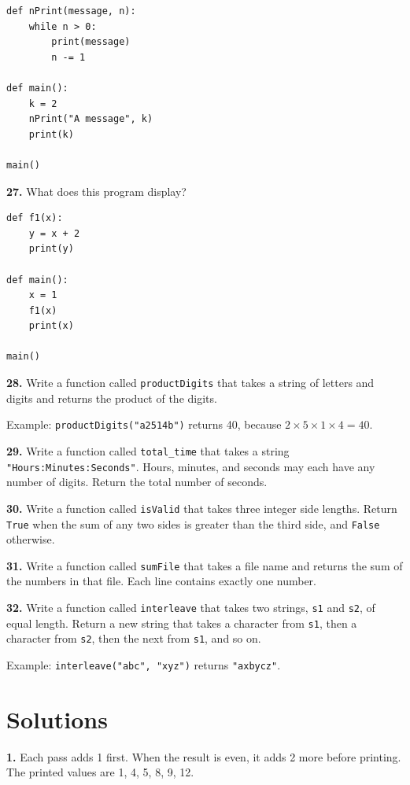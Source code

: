 \documentclass[11pt]{article}
\begin{document}
\begin{lstlisting}
def nPrint(message, n):
    while n > 0:
        print(message)
        n -= 1

def main():
    k = 2
    nPrint("A message", k)
    print(k)

main()
\end{lstlisting}

\textbf{27.} What does this program display?

\begin{lstlisting}
def f1(x):
    y = x + 2
    print(y)

def main():
    x = 1
    f1(x)
    print(x)

main()
\end{lstlisting}

\textbf{28.} Write a function called \texttt{productDigits} that takes a string of letters and digits and returns the product of the digits.

Example: \texttt{productDigits("a2514b")} returns 40, because \(2 \times 5 \times 1 \times 4 = 40\).

\textbf{29.} Write a function called \texttt{total\_time} that takes a string \texttt{"Hours:Minutes:Seconds"}. Hours, minutes, and seconds may each have any number of digits. Return the total number of seconds.

\textbf{30.} Write a function called \texttt{isValid} that takes three integer side lengths. Return \texttt{True} when the sum of any two sides is greater than the third side, and \texttt{False} otherwise.

\textbf{31.} Write a function called \texttt{sumFile} that takes a file name and returns the sum of the numbers in that file. Each line contains exactly one number.

\textbf{32.} Write a function called \texttt{interleave} that takes two strings, \texttt{s1} and \texttt{s2}, of equal length. Return a new string that takes a character from \texttt{s1}, then a character from \texttt{s2}, then the next from \texttt{s1}, and so on.

Example: \texttt{interleave("abc", "xyz")} returns \texttt{"axbycz"}.

\newpage

\section*{Solutions}

\textbf{1.} Each pass adds 1 first. When the result is even, it adds 2 more before printing. The printed values are 1, 4, 5, 8, 9, 12.
\end{document}
